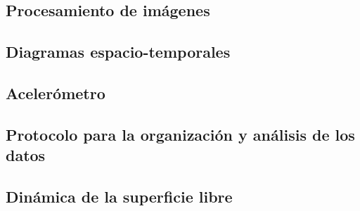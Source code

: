 \documentclass[../main.tex]{subfiles}
\begin{document}
\subsection{Procesamiento de imágenes}


\subsection{Diagramas espacio-temporales}


%

\subsection{Acelerómetro}


\subsection{Protocolo para la organización y análisis de los datos}


\subsection{Dinámica de la superficie libre}

\end{document}
